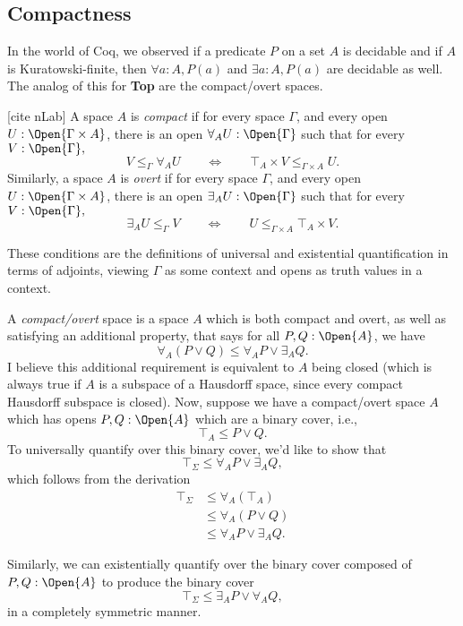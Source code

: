 \subsection{Compactness}

In the world of Coq, we observed if a predicate $P$ on a set $A$ is decidable and if $A$ is Kuratowski-finite, then $\forall a : A, P(a)$ and $\exists a : A, P(a)$ are decidable as well. The analog of this for \textbf{Top} are the compact/overt spaces.

[cite nLab]
A space $A$ is \emph{compact} if for every space $\Gamma$, and every open $U : \Open{\Gamma \times A}$, there is an open $\forall_A U : \Open{\Gamma}$ such that for every $V : \Open{\Gamma},$
\[
V \le_\Gamma \forall_A U \qquad \Leftrightarrow \qquad \top_A \times V \le_{\Gamma \times A} U.
\]
Similarly, a space $A$ is \emph{overt} if for every space $\Gamma$, and every open $U : \Open{\Gamma \times A}$, there is an open $\exists_A U : \Open{\Gamma}$ such that for every $V : \Open{\Gamma},$
\[
\exists_A U \le_\Gamma V  \qquad \Leftrightarrow \qquad U  \le_{\Gamma \times A} \top_A \times V.
\]

These conditions are the definitions of universal and existential quantification in terms of adjoints, viewing $\Gamma$ as some context and opens as truth values in a context.

A \emph{compact/overt} space is a space $A$ which is both compact and overt, as well as satisfying an additional property, that says for all $P, Q : \Open{A}$, we have
\[
\forall_A(P \vee Q) \le \forall_A P \vee \exists_A Q.
\]
I believe this additional requirement is equivalent to $A$ being closed (which is always true if $A$ is a subspace of a Hausdorff space, since every compact Hausdorff subspace is closed).
Now, suppose we have a compact/overt space $A$ which has opens $P, Q : \Open{A}$ which are a binary cover, i.e.,
\[
\top_A \le P \vee Q.
\]
To universally quantify over this binary cover, we'd like to show that
\[
\top_\Sigma \le \forall_A P \vee \exists_A Q,
\]
which follows from the derivation
\begin{align*}
\top_\Sigma 
  &\le \forall_A (\top_A)
\\ &\le \forall_A(P \vee Q)  \tag{since $\top_A \le P \vee Q$}
\\ &\le \forall_A P \vee \exists_A Q \tag{since $A$ is compact/overt}.
\end{align*}

Similarly, we can existentially quantify over the binary cover composed of $P, Q : \Open{A}$ to produce the binary cover
\[
\top_\Sigma \le \exists_A P \vee \forall_A Q,
\]
in a completely symmetric manner.

